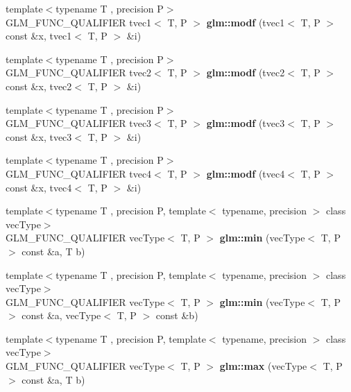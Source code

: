 \begin{DoxyCompactItemize}
{\footnotesize template$<$typename T , precision P$>$ }\\G\+L\+M\+\_\+\+F\+U\+N\+C\+\_\+\+Q\+U\+A\+L\+I\+F\+I\+ER tvec1$<$ T, P $>$ {\bfseries glm\+::modf} (tvec1$<$ T, P $>$ const \&x, tvec1$<$ T, P $>$ \&i)
\item 
\mbox{\label{func__common_8inl_aaa2408e8f0b4dc150a54ab6644c17f39}} 
{\footnotesize template$<$typename T , precision P$>$ }\\G\+L\+M\+\_\+\+F\+U\+N\+C\+\_\+\+Q\+U\+A\+L\+I\+F\+I\+ER tvec2$<$ T, P $>$ {\bfseries glm\+::modf} (tvec2$<$ T, P $>$ const \&x, tvec2$<$ T, P $>$ \&i)
\item 
\mbox{\label{func__common_8inl_ab95650561bcf376c17813a1b09e5ff41}} 
{\footnotesize template$<$typename T , precision P$>$ }\\G\+L\+M\+\_\+\+F\+U\+N\+C\+\_\+\+Q\+U\+A\+L\+I\+F\+I\+ER tvec3$<$ T, P $>$ {\bfseries glm\+::modf} (tvec3$<$ T, P $>$ const \&x, tvec3$<$ T, P $>$ \&i)
\item 
\mbox{\label{func__common_8inl_ab562559172a505edca9444da652387dd}} 
{\footnotesize template$<$typename T , precision P$>$ }\\G\+L\+M\+\_\+\+F\+U\+N\+C\+\_\+\+Q\+U\+A\+L\+I\+F\+I\+ER tvec4$<$ T, P $>$ {\bfseries glm\+::modf} (tvec4$<$ T, P $>$ const \&x, tvec4$<$ T, P $>$ \&i)
\item 
{\footnotesize template$<$typename T , precision P, template$<$ typename, precision $>$ class vec\+Type$>$ }\\G\+L\+M\+\_\+\+F\+U\+N\+C\+\_\+\+Q\+U\+A\+L\+I\+F\+I\+ER vec\+Type$<$ T, P $>$ {\bfseries glm\+::min} (vec\+Type$<$ T, P $>$ const \&a, T b)
\item 
{\footnotesize template$<$typename T , precision P, template$<$ typename, precision $>$ class vec\+Type$>$ }\\G\+L\+M\+\_\+\+F\+U\+N\+C\+\_\+\+Q\+U\+A\+L\+I\+F\+I\+ER vec\+Type$<$ T, P $>$ {\bfseries glm\+::min} (vec\+Type$<$ T, P $>$ const \&a, vec\+Type$<$ T, P $>$ const \&b)
\item 
{\footnotesize template$<$typename T , precision P, template$<$ typename, precision $>$ class vec\+Type$>$ }\\G\+L\+M\+\_\+\+F\+U\+N\+C\+\_\+\+Q\+U\+A\+L\+I\+F\+I\+ER vec\+Type$<$ T, P $>$ {\bfseries glm\+::max} (vec\+Type$<$ T, P $>$ const \&a, T b)
\item 

\end{DoxyCompactItemize}
